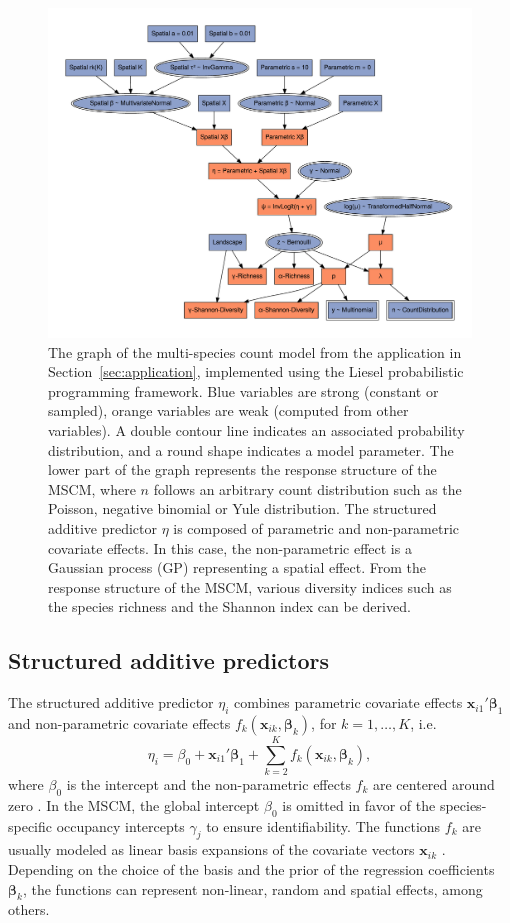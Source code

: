 \documentclass{article}
\newcommand{\xvec}{\bm{x}}
\newcommand{\betavec}{\bm{\beta}}
\begin{document}
\begin{figure}
\centering
\includegraphics[width=\linewidth]{figures/rtg-graph}
\caption{The graph of the multi-species count model from the application in Section~\ref{sec:application}, implemented using the Liesel probabilistic programming framework. Blue variables are strong (constant or sampled), orange variables are weak (computed from other variables). A double contour line indicates an associated probability distribution, and a round shape indicates a model parameter. The lower part of the graph represents the response structure of the MSCM, where $n$ follows an arbitrary count distribution such as the Poisson, negative binomial or Yule distribution. The structured additive predictor $\eta$ is composed of parametric and non-parametric covariate effects. In this case, the non-parametric effect is a Gaussian process (GP) representing a spatial effect. From the response structure of the MSCM, various diversity indices such as the species richness and the Shannon index can be derived.}
\label{fig:rtg-graph}
\end{figure}

\subsection{Structured additive predictors}
\label{sec:predictor}

The structured additive predictor $\eta_i$ combines parametric covariate effects $\xvec_{i1}'\betavec_1$ and non-parametric covariate effects $f_k(\xvec_{ik}, \betavec_k)$, for $k = 1, \dots, K$, i.e.
$$\eta_i = \beta_0 + \xvec_{i1}'\betavec_1 + \sum_{k=2}^{K} f_{k}(\xvec_{ik}, \betavec_k),$$
where $\beta_0$ is the intercept and the non-parametric effects $f_k$ are centered around zero \citep[Chapter~4]{fahrmeirPenalized2004, woodGeneralized2017}. In the MSCM, the global intercept $\beta_0$ is omitted in favor of the species-specific occupancy intercepts $\gamma_j$ to ensure identifiability. The functions $f_k$ are usually modeled as linear basis expansions of the covariate vectors $\xvec_{ik}$ \citep[Chapter~5]{hastieElements2009}. Depending on the choice of the basis and the prior of the regression coefficients $\betavec_k$, the functions can represent non-linear, random and spatial effects, among others.
\end{document}
